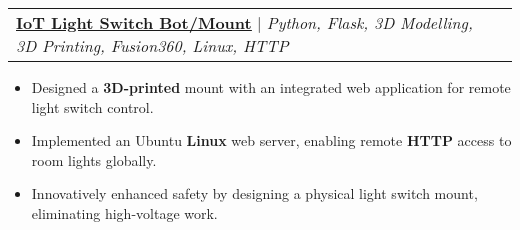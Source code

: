 \documentclass[letterpaper]{article}
\makeatletter
\newcommand{\resumeItem}[1]{
  \item\small{
    {#1 \vspace{-2pt}}
  }
}
\newcommand{\resumeProjectHeading}[2]{
    \item
    \begin{tabular*}{0.97\textwidth}{l@{\extracolsep{\fill}}r}
      \small#1 & #2 \\
    \end{tabular*}\vspace{-7pt}
}
\newcommand{\resumeProjectHeadingWithDetails}[4]{
    \item
    \begin{tabular*}{0.97\textwidth}{l@{\extracolsep{\fill}}r}
      \small#1 & #2 \\[5pt] %
      \textit{\small#3} & \textit{\small #4} \\
    \end{tabular*}\vspace{-7pt}
}
\newcommand{\resumeItemListStart}{\begin{itemize}}
\newcommand{\resumeItemListEnd}{\end{itemize}\vspace{-5pt}}
\makeatother
\begin{document}



\resumeProjectHeading
{\textbf{\href{https://www.gavintranquilino.com/light-switch.html}{\underline{IoT Light Switch Bot/Mount}}} $|$ \emph{Python, Flask, 3D Modelling, 3D Printing, Fusion360, Linux, HTTP}}{}
\resumeItemListStart
\resumeItem{Designed a \textbf{3D-printed} mount with an integrated web application for remote light switch control.}
\resumeItem{Implemented an Ubuntu \textbf{Linux} web server, enabling remote \textbf{HTTP} access to room lights globally.}
\resumeItem{Innovatively enhanced safety by designing a physical light switch mount, eliminating high-voltage work.}
\resumeItemListEnd

\end{document}
